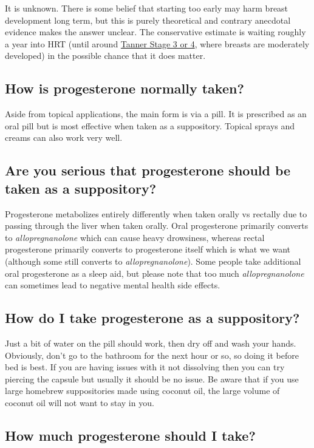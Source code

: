 \documentclass{article}
\begin{document}
It is unknown. There is some belief that starting too early may harm breast development long term, but this is purely theoretical and contrary anecdotal evidence makes the answer unclear. The conservative estimate is waiting roughly a year into HRT (until around \href{https://en.wikipedia.org/wiki/File:Tanner_scale-female.svg}{Tanner Stage 3 or 4}, where breasts are moderately developed) in the possible chance that it does matter.

\subsection{How is progesterone normally taken?}

Aside from topical applications, the main form is via a pill. It is prescribed as an oral pill but is most effective when taken as a suppository. Topical sprays and creams can also work very well.

\subsection{Are you serious that progesterone should be taken as a suppository?}

Progesterone metabolizes entirely differently when taken orally vs rectally due to passing through the liver when taken orally. Oral progesterone primarily converts to \textit{allopregnanolone} which can cause heavy drowsiness, whereas rectal progesterone primarily converts to progesterone itself which is what we want (although some still converts to \textit{allopregnanolone}). Some people take additional oral progesterone as a sleep aid, but please note that too much \textit{allopregnanolone} can sometimes lead to negative mental health side effects.

\subsection{How do I take progesterone as a suppository?}

Just a bit of water on the pill should work, then dry off and wash your hands. Obviously, don’t go to the bathroom for the next hour or so, so doing it before bed is best. If you are having issues with it not dissolving then you can try piercing the capsule but usually it should be no issue. Be aware that if you use large homebrew suppositories made using coconut oil, the large volume of coconut oil will not want to stay in you.

\subsection{How much progesterone should I take?}
\end{document}

